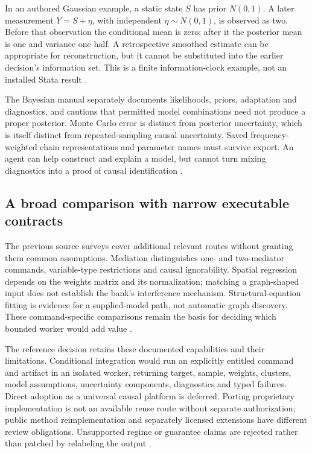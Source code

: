 In an authored Gaussian example, a static state $S$ has prior $N(0,1)$.
A later measurement $Y=S+\eta$, with independent $\eta\sim N(0,1)$, is
observed as two. Before that observation the conditional mean is zero;
after it the posterior mean is one and variance one half. A retrospective
smoothed estimate can be appropriate for reconstruction, but it cannot
be substituted into the earlier decision's information set. This is a
finite information-clock example, not an installed Stata result
\citep{exec24_stata_choice}.

The Bayesian manual separately documents likelihoods, priors, adaptation
and diagnostics, and cautions that permitted model combinations need not
produce a proper posterior. Monte Carlo error is distinct from posterior
uncertainty, which is itself distinct from repeated-sampling causal
uncertainty. Saved frequency-weighted chain representations and parameter
names must survive export. An agent can help construct and explain a model,
but cannot turn mixing diagnostics into a proof of causal identification
\citep{exec22_state_stata_bayesmh,exec24_stata_choice}.

\subsection{A broad comparison with narrow executable contracts}
The previous source surveys cover additional relevant routes without
granting them common assumptions. Mediation distinguishes one- and
two-mediator commands, variable-type restrictions and causal ignorability.
Spatial regression depends on the weights matrix and its normalization;
matching a graph-shaped input does not establish the bank's interference
mechanism. Structural-equation fitting is evidence for a supplied-model
path, not automatic graph discovery. These command-specific comparisons
remain the basis for deciding which bounded worker would add value
\citep{exec13_ci_stata_mediate,exec20_med_stata_multiple,
exec20_network_stata_spregress,exec13_stata_sem,exec24_stata_choice}.

The reference decision retains these documented capabilities and their
limitations. Conditional integration would run an explicitly entitled
command and artifact in an isolated worker, returning target, sample,
weights, clusters, model assumptions, uncertainty components, diagnostics
and typed failures. Direct adoption as a universal causal platform is
deferred. Porting proprietary implementation is not an available reuse route
without separate authorization; public method reimplementation and
separately licensed extensions have different review obligations.
Unsupported regime or guarantee claims are rejected rather than patched
by relabeling the output \citep{exec13_ivrd_license,exec24_stata_choice}.

